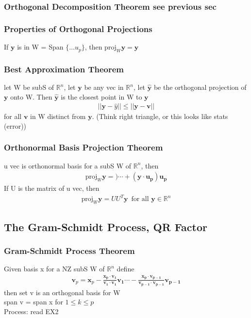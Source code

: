 \documentclass[12pt]{article}
\newcommand{\R}{\mathbb{R}}
\begin{document}
    \subsubsection{Orthogonal Decomposition Theorem see previous sec}
    \subsubsection{Properties of Orthogonal Projections}
        If  $\bm{y}$  is in W = Span $\{\dots u_{p}\}$, then
        $\text{proj}_{W}\bm{y}= \bm{y}$ 
    \subsubsection{Best Approximation Theorem}
        let W be subS of $\R^n$, let $\bm{y}$  be any vec in $\R^n$,
        let $\bm{\hat{y}}$  be the orthogonal projection of
         $\bm{y}$ onto W. Then $\bm{\hat{y}}$  is the closest point 
         in W to $\bm{y}$ 
         \begin{align*}
             ||\bm{y}-\hat{y}|| \le ||\bm{y} - \bm{v}||
         \end{align*}
         for all $\bm{v}$  in W distinct from $\bm{y}$.
        (Think right triangle, or this looks like stats (error))
    \subsubsection{Orthonormal Basis Projection Theorem}
        u vec is orthonormal basis for a subS W of $\R^n$, then
        \begin{align*}
            \text{proj}_{W}\bm{y}= )\cdots+ (\bm{y}\cdot \bm{u_{p}})\bm{u_{p}}
        \end{align*}
        If U is the matrix of u vec, then
        \begin{align*}
            \text{proj}_W\bm{y}= UU^T\bm{y}\,\,\,
            \text{for all }\bm{y}\in\R^n
        \end{align*}
\subsection{The Gram-Schmidt Process, QR Factor}
    \subsubsection{Gram-Schmidt Process Theorem}
        Given basis x for a NZ subS W of $\R^n$  define
        \begin{align*}
            \bm{v}_{p} = \bm{x}_{p} -
            \frac{\bm{x_{p}}\cdot \bm{v_{1}}}{\bm{v_{1}}\cdot\bm{v_{1}}}\bm{v_{1}}
            \cdots -\frac{\bm{x_{p}}\cdot \bm{v_{p-1}}}
            {\bm{v_{p-1}}\cdot\bm{v_{p-1}}}\bm{v_{p-1}}
        \end{align*}
        then set v is an orthogonal basis for W\\
        span v = span x for $1\le k\le p$ \\
        Process: read EX2
\end{document}
